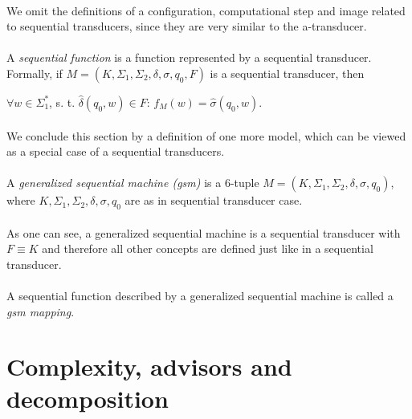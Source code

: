 \paragraph{}
We omit the definitions of a configuration, computational step and image related to sequential transducers, since they are very similar to the a-transducer.

\paragraph{}
 A \emph{sequential function} is a function represented by a sequential transducer. Formally, if $M=(K, \Sigma_{1}, \Sigma_{2}, \delta, \sigma, q_{0}, F)$ is a sequential transducer, then \\
\centerline{$\forall w \in \Sigma_{1}^{*}$, s. t. $\hat{\delta}(q_{0}, w) \in F$: $f_{M}(w) = \hat{\sigma}(q_{0}, w)$.}

\paragraph{}
We conclude this section by a definition of one more model, which can be viewed as a special case of a sequential transducers.

\paragraph{}
 A \emph{generalized sequential machine (gsm)} is a 6-tuple $M=(K, \Sigma_{1}, \Sigma_{2}, \delta, \sigma, q_{0})$, where $K, \Sigma_{1}, \Sigma_{2}, \delta, \sigma, q_{0}$ are as in sequential transducer case.

\paragraph{}
As one can see, a generalized sequential machine is a sequential transducer with $F \equiv K$ and therefore all other concepts are defined just like in a sequential transducer.

\paragraph{}
\oznacenie A sequential function described by a generalized sequential machine is called a \emph{gsm mapping}.

\section{Complexity, advisors and decomposition}

